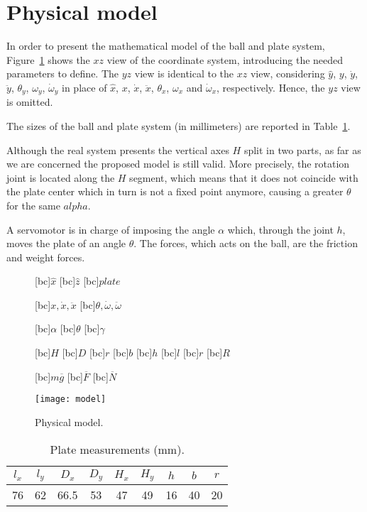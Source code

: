\section{Physical model}
\label{sec:model}

In order to present the mathematical model of the ball and plate system,
Figure~\ref{fig:model} shows the $xz$ view of the coordinate system,
introducing the needed parameters to define.
The $yz$ view is identical to the $xz$ view,
considering $\hat{y}$, $y$, $\dot{y}$, $\ddot{y}$, $\theta_y$,
$\omega_y$, $\dot{\omega}_y$ in place of $\hat{x}$, $x$, $\dot{x}$,
$\ddot{x}$, $\theta_x$, $\omega_x$ and $\dot{\omega}_x$, respectively.
Hence, the $yz$ view is omitted.

The sizes of the ball and plate system (in millimeters) are reported in
Table~\ref{tab:measurements}.

Although the real system presents the vertical axes $H$ split in two parts,
as far as we are concerned the proposed model is still valid.
More precisely, the rotation joint is located along the $H$ segment, which means
that it does not coincide with the plate center which in turn is not a fixed
point anymore, causing a greater $\theta$ for the same $alpha$.

A servomotor is in charge of imposing the angle $\alpha$ which,
through the joint $h$, moves the plate of an angle $\theta$.
The forces, which acts on the ball, are the friction and weight forces.

\begin{figure}[htb]
  \centering

  [bc]{\small$\hat{x}$}
  [bc]{\small$\hat{z}$}
  [bc]{\small$plate$}

  [bc]{\small$x, \dot{x}, \ddot{x}$}
  [bc]{\small$\theta, \dot{\omega}, \ddot{\omega}$}

  [bc]{\small$\alpha$}
  [bc]{\small$\theta$}
  [bc]{\small$\gamma$}

  [bc]{\small$H$}
  [bc]{\small$D$}
  [bc]{\small$r$}
  [bc]{\small$b$}
  [bc]{\small$h$}
  [bc]{\small$l$}
  [bc]{\small$r$}
  [bc]{\small$R$}

  [bc]{\small$m\overline{g}$}
  [bc]{\small$\overline{F}$}
  [bc]{\small$\overline{N}$}

  \texttt{[image: model]}
  \caption{Physical model.}
  \label{fig:model}
\end{figure}

\begin{table}
	\centering
	\begin{tabular}{ |c|c|c|c|c|c|c|c|c| }
		\hline
		$l_x$ & $l_y$ & $D_x$ & $D_y$ & $H_x$ & $H_y$ & $h$ & $b$ & $r$\\
		\hline
		76    & 62    & 66.5  & 53    & 47    & 49    & 16  & 40  & 20\\
		\hline
	\end{tabular}
	\caption{Plate measurements (mm).}
	\label{tab:measurements}
\end{table}

